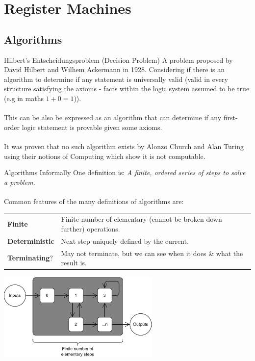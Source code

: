 \chapter{Register Machines}

\section{Algorithms}

\begin{definitionbox}{Hilbert's Entscheidungsproblem (Decision Problem)}
	A problem proposed by David Hilbert and Wilhem Ackermann in 1928. Considering if there is an algorithm to determine if any statement is universally valid (valid in every structure satisfying the axioms - facts within the logic system assumed to be true (e.g in maths $1 + 0 = 1$)).
	\\
	\\ This can be also be expressed as an algorithm that can determine if any first-order logic statement is provable given some axioms.
	\\
	\\ It was proven that no such algorithm exists by Alonzo Church and Alan Turing using their notions of Computing which show it is not computable.
\end{definitionbox}

\begin{definitionbox}{Algorithms Informally}
	One definition is: \textit{A finite, ordered series of steps to solve a problem.}
	\\
	\\ Common features of the many definitions of algorithms are:
    \begin{center}
        \begin{tabular}{l p{}}
            \textbf{Finite} & Finite number of elementary (cannot be broken down further) operations. \\
            \textbf{Deterministic} & Next step uniquely defined by the current. \\
            \textbf{Terminating}? & May not terminate, but we can see when it does \& what the result is. \\
        \end{tabular}
    \end{center}
    \begin{center}
        \includegraphics[width=0.6\textwidth]{register_machines/images/algorithm.drawio.png}
    \end{center}
\end{definitionbox}

